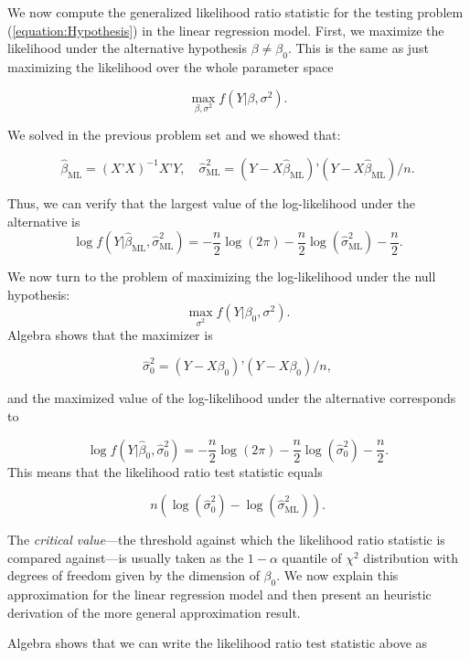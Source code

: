 \documentclass[11pt]{article} %
\begin{document}
 We now compute the generalized likelihood ratio statistic for the testing problem (\ref{equation:Hypothesis}) in the linear regression model. First, we maximize the likelihood under the alternative hypothesis $\beta \neq \beta_0$. This is the same as just maximizing the likelihood over the whole parameter space

\[  \max_{\beta, \sigma^2} f(Y | \beta , \sigma^2). \] 

\noindent We solved in the previous problem set and we showed that:

\[ \widehat{\beta}_{\textrm{ML}} = (X’X)^{-1}X’Y, \quad \widehat{\sigma}^2_{\textrm{ML}} = (Y-X\widehat{\beta}_{\textrm{ML}})’(Y-X\widehat{\beta}_{\textrm{ML}})/n. \] 

\noindent Thus, we can verify that the largest value of the log-likelihood under the alternative is
\[ \log f(Y | \widehat{\beta}_{\textrm{ML}}, \widehat{\sigma}^2_{\textrm{ML}}) = - \frac{n}{2} \log(2 \pi ) - \frac{n}{2} \log( \widehat{\sigma}^2_{\textrm{ML}}) - \frac{n}{2}. \]

\noindent We now turn to the problem of maximizing the log-likelihood under the null hypothesis:
\[ \max_{\sigma^2} f(Y | \beta_0 , \sigma^2). \]
Algebra shows that the maximizer is

\[\widehat{\sigma}^2_{0} = (Y-X\beta_0)’(Y-X \beta_0)/n,\]

\noindent and the maximized value of the log-likelihood under the alternative corresponds to

\[ \log f(Y | \widehat{\beta}_{0}, \widehat{\sigma}^2_{0}) = - \frac{n}{2} \log(2 \pi ) - \frac{n}{2} \log( \widehat{\sigma}^2_{0}) - \frac{n}{2}. \]
\noindent This means that the likelihood ratio test statistic equals

\begin{equation} \label{equation:GLR}
n  \left( \log ( \widehat{\sigma}^2_{0} ) -\log( \widehat{\sigma}^2_{\textrm{ML}} ) \right). 
\end{equation}

The \emph{critical value}---the threshold against which the likelihood ratio statistic is compared against---is usually taken as the $1-\alpha$ quantile of $\chi^2$ distribution with degrees of freedom given by the dimension of $\beta_0$. We now explain this approximation for the linear regression model and then present an heuristic derivation of the more general approximation result. 

Algebra shows that we can write the likelihood ratio test statistic above as
\end{document}
